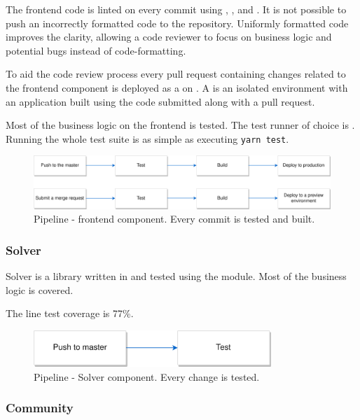 The frontend code is linted on every commit using , , and . It is not possible to push an incorrectly formatted code to the repository.
Uniformly formatted code improves the clarity, allowing a code reviewer to focus on business logic and potential bugs instead of code-formatting.

\medskip

To aid the code review process every pull request containing changes related to the frontend component is deployed as a  on . A  is an isolated environment with an application built using the code submitted along with a pull request.

\medskip

Most of the business logic on the frontend is tested. The test runner of choice is . Running the whole test suite is as simple as executing \texttt{yarn test}.

\begin{figure}[H]
  \caption{Pipeline - frontend component. Every commit is tested and built.}
  \centering
    \includegraphics[width=\textwidth]{assets/3-frontend-pipeline.png}
\end{figure}
\clearpage
\subsubsection{Solver}

Solver is a library written in  and tested using the  module. Most of the business logic is covered. 

The line test coverage is 77\%.

\begin{figure}[H]
  \caption{Pipeline - Solver component. Every change is tested.}
  \centering
    \includegraphics[width=0.8\textwidth]{assets/3-Solver-pipeline.png}
\end{figure}


\subsubsection{Community}

